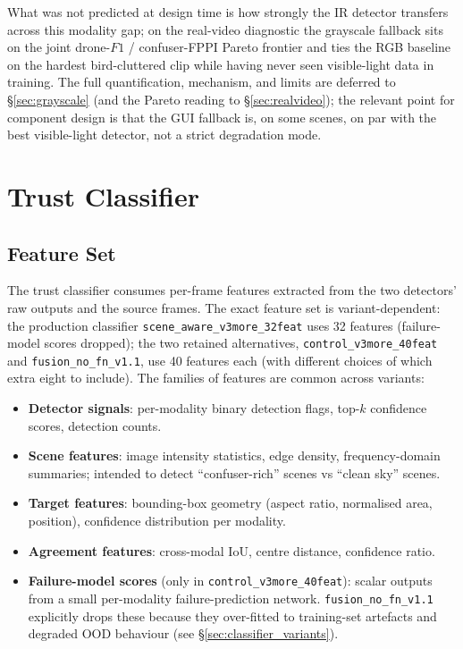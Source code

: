 \documentclass[12pt,a4paper,oneside,openright]{book}
\begin{document}
What was not predicted at design time is how strongly the IR detector transfers across this modality gap; on the real-video diagnostic the grayscale fallback sits on the joint drone-$F1$ / confuser-FPPI Pareto frontier and ties the RGB baseline on the hardest bird-cluttered clip while having never seen visible-light data in training. The full quantification, mechanism, and limits are deferred to \S\ref{sec:grayscale} (and the Pareto reading to \S\ref{sec:realvideo}); the relevant point for component design is that the GUI fallback is, on some scenes, on par with the best visible-light detector, not a strict degradation mode.

\section{Trust Classifier}
\label{sec:trust_classifier}

\subsection{Feature Set}

The trust classifier consumes per-frame features extracted from the two detectors' raw outputs and the source frames. The exact feature set is variant-dependent: the production classifier \texttt{scene\_aware\_v3more\_32feat} uses 32 features (failure-model scores dropped); the two retained alternatives, \texttt{control\_v3more\_40feat} and \texttt{fusion\_no\_fn\_v1.1}, use 40 features each (with different choices of which extra eight to include). The families of features are common across variants:

\begin{itemize}
    \item \textbf{Detector signals}: per-modality binary detection flags, top-$k$ confidence scores, detection counts.
    \item \textbf{Scene features}: image intensity statistics, edge density, frequency-domain summaries; intended to detect ``confuser-rich'' scenes vs ``clean sky'' scenes.
    \item \textbf{Target features}: bounding-box geometry (aspect ratio, normalised area, position), confidence distribution per modality.
    \item \textbf{Agreement features}: cross-modal IoU, centre distance, confidence ratio.
    \item \textbf{Failure-model scores} (only in \texttt{control\_v3more\_40feat}): scalar outputs from a small per-modality failure-prediction network. \texttt{fusion\_no\_fn\_v1.1} explicitly drops these because they over-fitted to training-set artefacts and degraded OOD behaviour (see \S\ref{sec:classifier_variants}).
\end{itemize}
\end{document}
